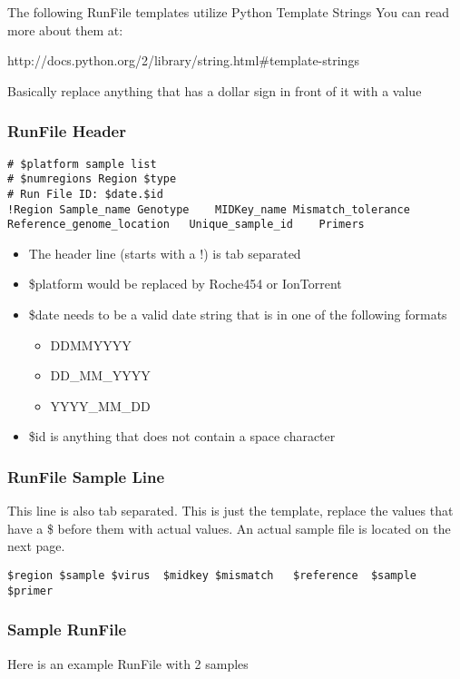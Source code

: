 \documentclass{article}
\begin{document}
The following RunFile templates utilize Python Template Strings
You can read more about them at:

http://docs.python.org/2/library/string.html\#template-strings

Basically replace anything that has a dollar sign in front of it with a value

\subsubsection{RunFile Header}
\begin{lstlisting}[basicstyle=\tiny]
# $platform sample list
# $numregions Region $type
# Run File ID: $date.$id
!Region	Sample_name	Genotype	MIDKey_name	Mismatch_tolerance	Reference_genome_location	Unique_sample_id	Primers	
\end{lstlisting}

\begin{itemize}
 \item The header line (starts with a !) is tab separated
 \item \$platform would be replaced by Roche454 or IonTorrent
 \item \$date needs to be a valid date string that is in one of the following formats
 \begin{itemize}
  \item DDMMYYYY
  \item DD\_MM\_YYYY
  \item YYYY\_MM\_DD
 \end{itemize}
 \item \$id is anything that does not contain a space character
\end{itemize}
\subsubsection{RunFile Sample Line}
This line is also tab separated. This is just the template, replace the values that have a \$ before them with actual values.
An actual sample file is located  on the next page.
\begin{lstlisting}[basicstyle=\tiny]
$region	$sample	$virus	$midkey	$mismatch	$reference	$sample	$primer	
\end{lstlisting}

\subsubsection{Sample RunFile}
Here is an example RunFile with 2 samples
\end{document}
